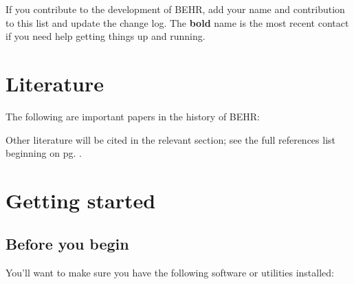 \documentclass[12pt]{article}
\begin{document}
	If you contribute to the development of BEHR, add your name and contribution to this list and update the change log. The \textbf{bold} name is the most recent contact if you need help getting things up and running.

\section{Literature}

	The following are important papers in the history of BEHR:

	\vspace{1em}
	
	\vspace{1em}
	
	\vspace{1em}
	
	\vspace{1em}
	Other literature will be cited in the relevant section; see the full references list beginning on pg. \pageref{thebib}.

\section{Getting started}
	\subsection{Before you begin}

	You'll want to make sure you have the following software or utilities installed:
\end{document}
